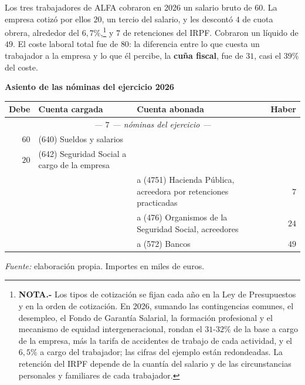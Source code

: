 \documentclass[10pt,a4paper]{article}
\begin{document}
Los tres trabajadores de ALFA cobraron en 2026 un salario bruto de $60$. La empresa cotizó por ellos $20$, un tercio del salario, y les descontó $4$ de cuota obrera, alrededor del $6,7\%$,\footnote{%
    \textbf{NOTA.-} Los tipos de cotización se fijan cada año en la Ley de Presupuestos y en la orden de cotización. En 2026, sumando las contingencias comunes, el desempleo, el Fondo de Garantía Salarial, la formación profesional y el mecanismo de equidad intergeneracional, rondan el $31$-$32\%$ de la base a cargo de la empresa, más la tarifa de accidentes de trabajo de cada actividad, y el $6,5\%$ a cargo del trabajador; las cifras del ejemplo están redondeadas. La retención del IRPF depende de la cuantía del salario y de las circunstancias personales y familiares de cada trabajador.
} y $7$ de retenciones del IRPF. Cobraron un líquido de $49$. El coste laboral total fue de $80$: la diferencia entre lo que cuesta un trabajador a la empresa y lo que él percibe, la \textbf{cuña fiscal}, fue de $31$, casi el $39\%$ del coste.

\begin{center}\begin{minipage}{\linewidth}\centering
{\small\textbf{Asiento de las nóminas del ejercicio 2026}}\par\vspace{0.3em}
{\small
\begin{tabular}{r p{5.6cm} p{6.4cm} r}
\hline
\textbf{Debe} & \textbf{Cuenta cargada} & \textbf{Cuenta abonada} & \textbf{Haber} \\
\hline
\multicolumn{4}{c}{\textit{--- $7$ --- nóminas del ejercicio ---}} \\
$60$ & (640) Sueldos y salarios & & \\
$20$ & (642) Seguridad Social a cargo de la empresa & & \\
 & & \raggedright a (4751) Hacienda Pública, acreedora por retenciones practicadas & $7$ \\
 & & \raggedright a (476) Organismos de la Seguridad Social, acreedores & $24$ \\
 & & \raggedright a (572) Bancos & $49$ \\
\hline
\end{tabular}}\par\vspace{0.3em}
{\small\textit{Fuente: }elaboración propia. Importes en miles de euros.}
\end{minipage}\end{center}
\end{document}
